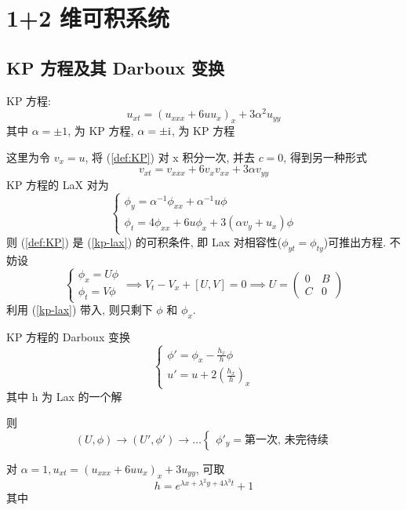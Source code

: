 \chapter{1+2 维可积系统}
\section{KP 方程及其 Darboux 变换}
\begin{definition}
    KP 方程: 
    \begin{equation}\label{def:KP}
        u_{xt} = (u_{xxx} + 6uu_{x})_{x} + 3 \alpha^{2}u_{yy}
    \end{equation} 
    其中 $ \alpha = \pm 1 $, 为 KP  方程, $ \alpha = \pm \mathrm{i} $, 为 KP  方程
\end{definition}
这里为令 $ v_{x} = u $, 将 (\ref{def:KP}) 对 x 积分一次, 并去 $ c = 0 $, 得到另一种形式 
\begin{equation}
    v_{xt} = v_{xxx} + 6v_{x}v_{xx} + 3 \alpha v_{yy} 
\end{equation}
KP 方程的 LaX 对为
\begin{equation}\label{kp-lax}
    \begin{cases}
        \phi_{y} = \alpha^{-1} \phi_{xx} + \alpha^{-1}u\phi \\
        \phi_{t} = 4 \phi_{xx} + 6u \phi_{x} + 3 (\alpha v_{y} + u_{x}) \phi
    \end{cases}
\end{equation}
则 (\ref{def:KP}) 是 (\ref{kp-lax}) 的可积条件, 即 Lax 对相容性($\phi_{yt} = \phi_{ty} $)可推出方程. 
不妨设 
\begin{equation*}
    \begin{cases}
        \phi_{x} = U \phi \\
        \phi_{t} = V \phi
    \end{cases} \implies V_{t} - V_{x} + [U,V] = 0 
    \implies U = \begin{pmatrix} 0 & B\\ C & 0 \end{pmatrix}
\end{equation*}
利用 (\ref{kp-lax}) 带入, 则只剩下 $ \phi $ 和 $ \phi_{x} $. 
\begin{definition}
    KP 方程的 Darboux 变换 
    \begin{equation*}
        \begin{cases}
            \phi' = \phi_{x} - \frac{h_{x}}{h} \phi \\
            u' = u + 2 (\frac{h_{x}}{h})_x
        \end{cases}
    \end{equation*}
    其中 h 为 Lax 的一个解
\end{definition}
则 
\begin{equation*}
    (U,\phi) \to (U',\phi') \to \dots
    \begin{cases}
        \phi'_{y} = \text{第一次, 未完待续}
    \end{cases}
\end{equation*}




\begin{example}
    对 $ \alpha = 1, u_{xt} = (u_{xxx} + 6uu_{x})_{x} + 3u_{yy} $, 可取 
    \begin{equation}
        h = e^{\lambda x + \lambda^{2}y + 4 \lambda^{3}t} + 1
    \end{equation} 
    其中 
\end{example}